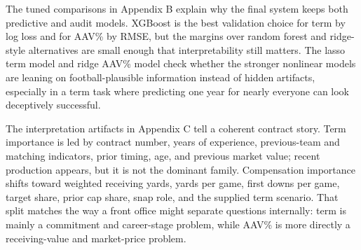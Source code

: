 \documentclass[
  10pt,
]{article}
\begin{document}
\begin{table}[H]
\centering
\caption{\label{tab:main-results-table}\label{tab:main-results} Main validation evidence and how it should be read.}
\centering
{}
\end{table}

The tuned comparisons in Appendix B explain why the final system keeps both predictive and audit models. XGBoost is the best validation choice for term by log loss and for AAV\% by RMSE, but the margins over random forest and ridge-style alternatives are small enough that interpretability still matters. The lasso term model and ridge AAV\% model check whether the stronger nonlinear models are leaning on football-plausible information instead of hidden artifacts, especially in a term task where predicting one year for nearly everyone can look deceptively successful.

The interpretation artifacts in Appendix C tell a coherent contract story. Term importance is led by contract number, years of experience, previous-team and matching indicators, prior timing, age, and previous market value; recent production appears, but it is not the dominant family. Compensation importance shifts toward weighted receiving yards, yards per game, first downs per game, target share, prior cap share, snap role, and the supplied term scenario. That split matches the way a front office might separate questions internally: term is mainly a commitment and career-stage problem, while AAV\% is more directly a receiving-value and market-price problem.
\end{document}
